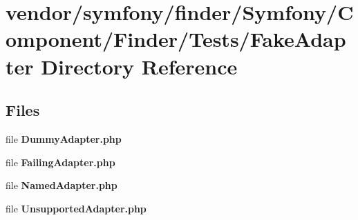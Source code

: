 \section{vendor/symfony/finder/\+Symfony/\+Component/\+Finder/\+Tests/\+Fake\+Adapter Directory Reference}
\label{dir_2e52d56dbeae6c71f7e0ccd38b03e870}
\subsection*{Files}
\begin{DoxyCompactItemize}
\item 
file {\bf Dummy\+Adapter.\+php}
\item 
file {\bf Failing\+Adapter.\+php}
\item 
file {\bf Named\+Adapter.\+php}
\item 
file {\bf Unsupported\+Adapter.\+php}
\end{DoxyCompactItemize}
